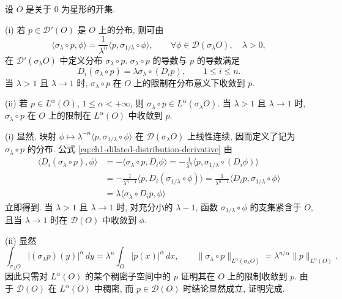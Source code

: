 \begin{Lemma}
\label{lem:ch1-dilation-distribution}
设 $O$ 是关于 $0$ 为星形的开集.

(i) 若 $p\in\mathcal D'(O)$ 是 $O$ 上的分布, 则可由
\begin{equation}
\langle\sigma_\lambda\circ p,\phi\rangle
=\frac{1}{\lambda^n}\langle p,\sigma_{1/\lambda}\circ\phi\rangle,
\qquad\forall\phi\in\mathcal D(\sigma_\lambda O),\quad\lambda>0,
\label{eq:ch1-dilated-distribution-definition}
\end{equation}
在 $\mathcal D'(\sigma_\lambda O)$ 中定义分布 $\sigma_\lambda\circ p$. $\sigma_\lambda\circ p$ 的导数与 $p$ 的导数满足
\begin{equation}
D_i(\sigma_\lambda\circ p)=\lambda\sigma_\lambda\circ(D_i p),
\qquad1\leq i\leq n.
\label{eq:ch1-dilated-distribution-derivative}
\end{equation}
当 $\lambda>1$ 且 $\lambda\to1$ 时, $\sigma_\lambda\circ p$ 在 $O$ 上的限制在分布意义下收敛到 $p$.

(ii) 若 $p\in L^\alpha(O)$, $1\leq\alpha<+\infty$, 则 $\sigma_\lambda\circ p\in L^\alpha(\sigma_\lambda O)$. 当 $\lambda>1$ 且 $\lambda\to1$ 时, $\sigma_\lambda\circ p$ 在 $O$ 上的限制在 $L^\alpha(O)$ 中收敛到 $p$.
\end{Lemma}

\begin{Proof}
(i) 显然, 映射 $\phi\mapsto\lambda^{-n}\langle p,\sigma_{1/\lambda}\circ\phi\rangle$ 在 $\mathcal D(\sigma_\lambda O)$ 上线性连续, 因而定义了记为 $\sigma_\lambda\circ p$ 的分布. 公式 \eqref{eq:ch1-dilated-distribution-derivative} 由
\begin{align*}
\langle D_i(\sigma_\lambda\circ p),\phi\rangle
&=-\langle\sigma_\lambda\circ p,D_i\phi\rangle
=-\frac1{\lambda^n}\langle p,\sigma_{1/\lambda}\circ(D_i\phi)\rangle\\
&=-\frac1{\lambda^{n-1}}\langle p,D_i(\sigma_{1/\lambda}\circ\phi)\rangle
=\frac1{\lambda^{n-1}}\langle D_i p,\sigma_{1/\lambda}\circ\phi\rangle\\
&=\lambda\langle\sigma_\lambda\circ D_i p,\phi\rangle
\end{align*}
立即得到. 当 $\lambda>1$ 且 $\lambda\to1$ 时, 对充分小的 $\lambda-1$, 函数 $\sigma_{1/\lambda}\circ\phi$ 的支集紧含于 $O$, 且当 $\lambda\to1$ 时在 $\mathcal D(O)$ 中收敛到 $\phi$.

(ii) 显然
\[
\int_{\sigma_\lambda O}\lvert(\sigma_\lambda p)(y)\rvert^\alpha\,dy
=\lambda^n\int_O\lvert p(x)\rvert^\alpha\,dx,
\qquad
\lVert\sigma_\lambda\circ p\rVert_{L^\alpha(\sigma_\lambda O)}
=\lambda^{n/\alpha}\lVert p\rVert_{L^\alpha(O)}.
\]
因此只需对 $L^\alpha(O)$ 的某个稠密子空间中的 $p$ 证明其在 $O$ 上的限制收敛到 $p$. 由于 $\mathcal D(O)$ 在 $L^\alpha(O)$ 中稠密, 而 $p\in\mathcal D(O)$ 时结论显然成立, 证明完成.
\end{Proof}

